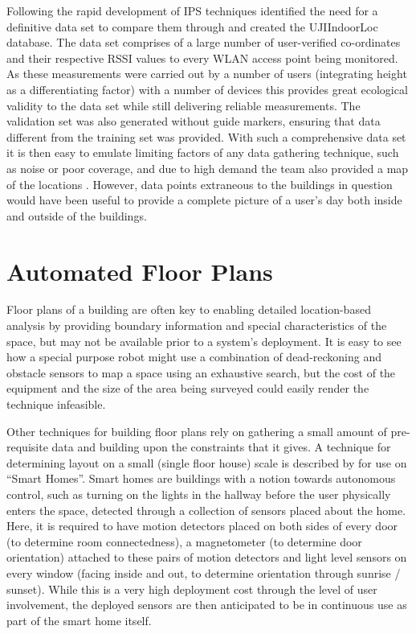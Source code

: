 \documentclass{UoYCSproject}
\begin{document}
                Following the rapid development of IPS techniques \citet{torres2014ujiindoorloc} identified the need for a definitive data set to compare them through and created the UJIIndoorLoc database. The data set comprises of a large number of user-verified co-ordinates and their respective RSSI values to every WLAN access point being monitored. As these measurements were carried out by a number of users (integrating height as a differentiating factor) with a number of devices this provides great ecological validity to the data set while still delivering reliable measurements. The validation set was also generated without guide markers, ensuring that data different from the training set was provided. With such a comprehensive data set it is then easy to emulate limiting factors of any data gathering technique, such as noise or poor coverage, and due to high demand the team also provided a map of the locations \citep{UJIIndoorLocMap}. However, data points extraneous to the buildings in question would have been useful to provide a complete picture of a user's day both inside and outside of the buildings.
            
        \section{Automated Floor Plans}
        \label{sec:floorplans}
        
            Floor plans of a building are often key to enabling detailed location-based analysis by providing boundary information and special characteristics of the space, but may not be available prior to a system's deployment. It is easy to see how a special purpose robot might use a combination of dead-reckoning and obstacle sensors to map a space using an exhaustive search, but the cost of the equipment and the size of the area being surveyed could easily render the technique infeasible.
            
            Other techniques for building floor plans rely on gathering a small amount of pre-requisite data and building upon the constraints that it gives. A technique for determining layout on a small (single floor house) scale is described by \citet{lu2012smart} for use on ``Smart Homes''. Smart homes are buildings with a notion towards autonomous control, such as turning on the lights in the hallway before the user physically enters the space, detected through a collection of sensors placed about the home. Here, it is required to have motion detectors placed on both sides of every door (to determine room connectedness), a magnetometer (to determine door orientation) attached to these pairs of motion detectors and light level sensors on every window (facing inside and out, to determine orientation through sunrise / sunset). While this is a very high deployment cost through the level of user involvement, the deployed sensors are then anticipated to be in continuous use as part of the smart home itself.
            
\end{document}

